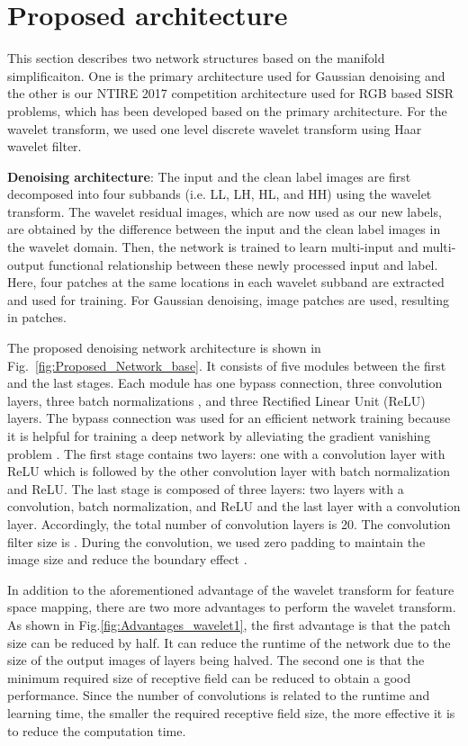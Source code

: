 \documentclass[10pt,twocolumn,letterpaper]{article}
\begin{document}
\section{Proposed architecture}
This section describes two network structures based on the manifold simplificaiton. One is the primary architecture used for Gaussian denoising and the other is our NTIRE 2017 competition architecture used for RGB based SISR problems, which has been developed based on the primary architecture. For the wavelet transform, we used one level discrete wavelet transform using Haar wavelet filter.

{\bf Denoising architecture}: The input and the clean label images are first decomposed into four subbands (i.e. LL, LH, HL, and HH) using the wavelet transform. 
The wavelet residual images, which are now used as our new labels, are obtained by the difference between the input and the clean label images in the wavelet domain. Then, the network is trained to learn multi-input and multi-output functional relationship between these newly processed input and label.
Here, four patches at the same locations in each wavelet subband are extracted and used for training.
For Gaussian denoising,  image patches are used, resulting in  patches. 







The proposed denoising network architecture is shown in Fig.~\ref{fig:Proposed_Network_base}. 
It consists of five modules between the first and the last stages. Each module has one bypass connection, three convolution layers, three batch normalizations \cite{ioffe2015batch}, and three Rectified Linear Unit (ReLU) \cite{glorot2011deep} layers. 
The bypass connection was used for an efficient network training because it is helpful for training a deep network by alleviating the gradient vanishing problem \cite{he2016identity,mao2016image}. 
The first stage contains two layers: one with a convolution layer with ReLU which is followed by the other convolution layer with batch normalization and ReLU.
The last stage is composed of three layers: two layers with a convolution, batch normalization, and ReLU and the last layer with a convolution layer.
Accordingly, the total number of convolution layers is 20.
The convolution filter size is .
During the convolution, we used zero padding to maintain the image size and reduce the boundary effect \cite{kim2015accurate}.

In addition to the aforementioned advantage of the wavelet transform for feature space mapping, there are two more advantages to perform the wavelet transform. As shown in Fig.\ref{fig:Advantages_wavelet1}, the first advantage is that the patch size can be reduced by half. It can reduce the runtime of the network due to the size of the output images of layers being halved. The second one is that the minimum required size of receptive field can be reduced to obtain a good performance. Since the number of convolutions is related to the runtime and learning time, the smaller the required receptive field size, the more effective it is to reduce the computation time.
\end{document}
